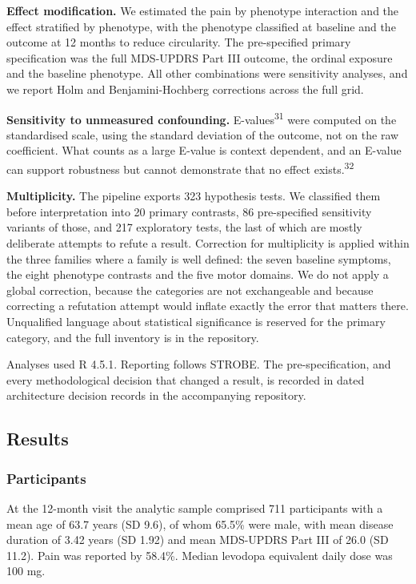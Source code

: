 \documentclass[
  english,
  12pt,
]{article}
\begin{document}
\textbf{Effect modification.} We estimated the pain by phenotype interaction and the effect stratified by phenotype, with the phenotype classified at baseline and the outcome at 12 months to reduce circularity. The pre-specified primary specification was the full MDS-UPDRS Part III outcome, the ordinal exposure and the baseline phenotype. All other combinations were sensitivity analyses, and we report Holm and Benjamini-Hochberg corrections across the full grid.

\textbf{Sensitivity to unmeasured confounding.} E-values\textsuperscript{31} were computed on the standardised scale, using the standard deviation of the outcome, not on the raw coefficient. What counts as a large E-value is context dependent, and an E-value can support robustness but cannot demonstrate that no effect exists.\textsuperscript{32}

\textbf{Multiplicity.} The pipeline exports 323 hypothesis tests. We classified them before interpretation into 20 primary contrasts, 86 pre-specified sensitivity variants of those, and 217 exploratory tests, the last of which are mostly deliberate attempts to refute a result. Correction for multiplicity is applied within the three families where a family is well defined: the seven baseline symptoms, the eight phenotype contrasts and the five motor domains. We do not apply a global correction, because the categories are not exchangeable and because correcting a refutation attempt would inflate exactly the error that matters there. Unqualified language about statistical significance is reserved for the primary category, and the full inventory is in the repository.

Analyses used R 4.5.1. Reporting follows STROBE. The pre-specification, and every methodological decision that changed a result, is recorded in dated architecture decision records in the accompanying repository.

\subsection{Results}\label{results}

\subsubsection{Participants}\label{participants}

At the 12-month visit the analytic sample comprised 711 participants with a mean age of 63.7 years (SD 9.6), of whom 65.5\% were male, with mean disease duration of 3.42 years (SD 1.92) and mean MDS-UPDRS Part III of 26.0 (SD 11.2). Pain was reported by 58.4\%. Median levodopa equivalent daily dose was 100 mg.
\end{document}
